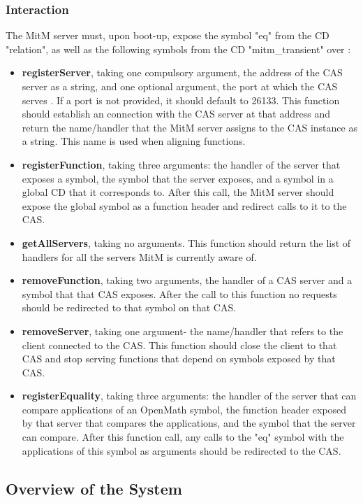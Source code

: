 \subsubsection{Interaction}
The MitM server must, upon boot-up, expose the symbol "eq" from the CD 
"relation", as well as the following symbols from the CD "mitm\_transient"
over \SCSCP:
\begin{itemize}
  \item \textbf{registerServer}, taking one compulsory argument, the address of the
    CAS server as a string, and one optional argument, the port at which the CAS
    serves \SCSCP. If a port is not provided, it should default to 26133. This
    function should establish an \SCSCP connection with the CAS server at that 
    address and return the name/handler that the MitM server assigns to the 
    CAS instance as a string. This name is used when aligning functions.
  \item \textbf{registerFunction}, taking three arguments: the handler of the 
    server that exposes a symbol, the symbol that the server exposes, and
    a symbol in a global CD that it corresponds to. After this call, the MitM
    server should expose the global symbol as a function header and redirect
    calls to it to the CAS.
  \item \textbf{getAllServers}, taking no arguments. This function should return 
    the list of handlers for all the servers MitM is currently aware of.
  \item \textbf{removeFunction}, taking two arguments, the handler of a CAS server 
    and a symbol that that CAS exposes. After the call to this function no 
    requests should be redirected to that symbol on that CAS.
  \item \textbf{removeServer}, taking one argument- the name/handler that refers
    to the client connected to the CAS. This function should close the \SCSCP client
    to that CAS and stop serving functions that depend on symbols exposed by
    that CAS.
  \item \textbf{registerEquality}, taking three arguments: the handler of the 
    server that can compare applications of an OpenMath symbol, the function
    header exposed by that server that compares the applications, and the symbol
    that the server can compare. After this function call, any calls to the "eq"
    symbol with the applications of this symbol as arguments should be redirected
    to the CAS.
\end{itemize}

\subsection{Overview of the System}

